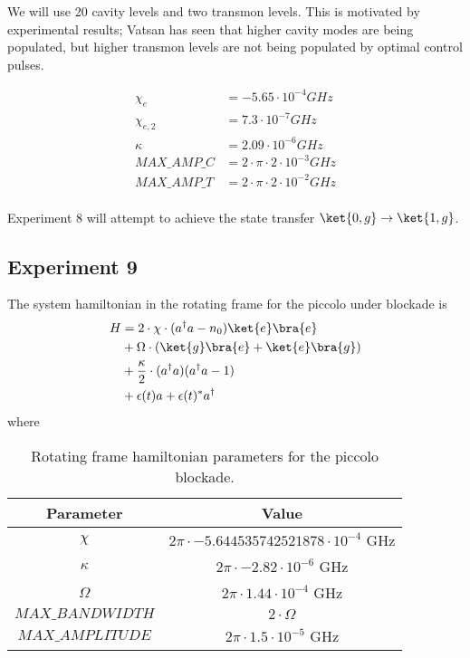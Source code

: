 \documentclass[letterpaper, 12pt]{article}
\begin{document}
We will use 20 cavity levels and two transmon levels. This is motivated by experimental results; Vatsan has seen that higher cavity modes are being populated, but higher transmon levels are not being populated by optimal control pulses.

\begin{align*}
  \chi_{e} &= -5.65 \cdot 10^{-4} GHz\\
  \chi_{e, 2} &= 7.3 \cdot 10^{-7} GHz\\
  \kappa &= 2.09 \cdot 10^{-6} GHz\\
  MAX\_AMP\_C &= 2 \cdot \pi \cdot 2 \cdot 10^{-3} GHz\\
  MAX\_AMP\_T &= 2 \cdot \pi \cdot 2 \cdot 10^{-2} GHz\\
\end{align*}

Experiment 8 will attempt to achieve the state transfer $\ket{0, g} \rightarrow \ket{1, g}$.

\subsection{Experiment 9}
The system hamiltonian in the rotating frame for the piccolo under blockade is
\begin{align*}
  H &= 2 \cdot \chi \cdot (a^{\dagger}a - n_{0}) \ket{e} \bra{e}\\
  &+ \Omega \cdot (\ket{g} \bra{e} + \ket{e} \bra{g})\\
  &+ \frac{\kappa}{2} \cdot (a^{\dagger}a)(a^{\dagger}a - 1)\\
  &+ \epsilon(t)a + \epsilon(t)^{*}a^{\dagger}
\end{align*}
where
\begin{table}[H]
  \begin{center}
    \begin{tabular}{c | c}
      Parameter & Value\\
      \hline
      $\chi$          & $2 \pi \cdot -5.644535742521878 \cdot 10^{-4}$ GHz\\
      $\kappa$        & $2 \pi \cdot -2.82 \cdot 10^{-6}$ GHz\\
      $\Omega$        & $2 \pi \cdot 1.44 \cdot 10^{-4}$ GHz\\
      $MAX\_BANDWIDTH$ & $2 \cdot \Omega$\\
      $MAX\_AMPLITUDE$ & $2 \pi \cdot 1.5 \cdot 10^{-5}$ GHz\\
    \end{tabular}
  \end{center}
  \caption{Rotating frame hamiltonian parameters for the piccolo blockade.}
\end{table}
\end{document}
